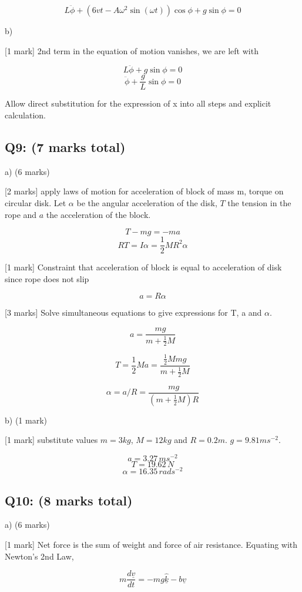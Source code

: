 \documentclass[a4paper,11pt]{article}
\begin{document}
\[ L \ddot{\phi} + \left (6vt - A\omega^2\sin(\omega t) \right )\cos{\phi} + g\sin{\phi} = 0 \]

b) 

[1 mark] 2nd term in the equation of motion vanishes, we are left with 

\[  L \ddot{\phi} + g\sin{\phi} = 0 \]
\[ \ddot{\phi} + \frac{g}{L}\sin{\phi} = 0 \]

Allow direct substitution for the expression of x into all steps and explicit calculation.

\subsection*{Q9: (7 marks total)}

a) (6 marks)

[2 marks] apply laws of motion for acceleration of block of mass m, torque on circular disk. Let \( \alpha \) be the angular acceleration of the disk, \( T \) the tension in the rope and \( a \) the acceleration of the block. 

\[ T - mg = -ma \]
\[ RT = I \alpha = \frac{1}{2} M R^2 \alpha \]

[1 mark] Constraint that acceleration of block is equal to acceleration of disk since rope does not slip 

\[ a = R \alpha \]

[3 marks] Solve simultaneous equations to give expressions for T, a and \( \alpha \).

\[ a = \frac{mg}{m + \frac{1}{2}M} \]

\[ T = \frac{1}{2}Ma = \frac{\frac{1}{2}Mmg}{m + \frac{1}{2}M} \]

\[ \alpha = a / R = \frac{mg}{(m + \frac{1}{2}M)R} \]

b) (1 mark) 

[1 mark] substitute values \(m = 3kg \), \( M = 12kg \) and \( R = 0.2m \). \(g = 9.81 ms^{-2} \).

\[ a = 3.27 \, ms^{-2} \]
\[ T = 19.62 \, N \]
\[ \alpha = 16.35 \, rads^{-2} \]

\subsection*{Q10: (8 marks total)}

a) (6 marks)

[1 mark] Net force is the sum of weight and force of air resistance. Equating with Newton’s 2nd Law, 

\[
m\frac{d\underline{v}}{dt} = - mg \hat{\underline{k}} - b\underline{v} 
\]
\end{document}
